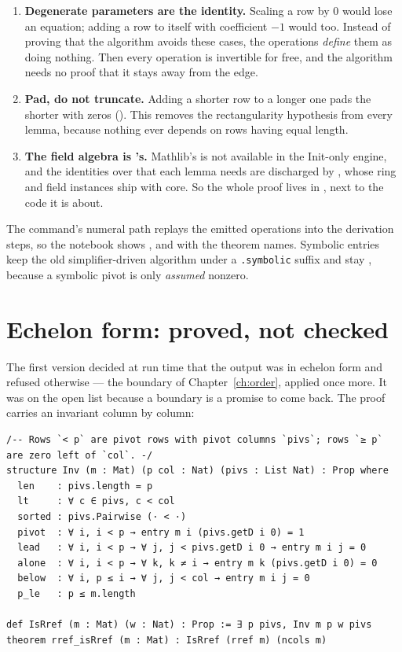 \begin{enumerate}[nosep]
  \item \textbf{Degenerate parameters are the identity.} Scaling a row by $0$ would lose an
    equation; adding a row to itself with coefficient $-1$ would too. Instead of proving that
    the algorithm avoids these cases, the operations \emph{define} them as doing nothing. Then
    every operation is invertible for free, and the algorithm needs no proof that it stays
    away from the edge.
  \item \textbf{Pad, do not truncate.} Adding a shorter row to a longer one pads the shorter with
    zeros (). This removes the rectangularity hypothesis from every lemma, because
    nothing ever depends on rows having equal length.
  \item \textbf{The field algebra is 's.} Mathlib's  is not available in the
    Init-only engine, and the identities over  that each lemma needs are discharged by
    , whose ring and field instances ship with core. So the whole proof lives in
    , next to the code it is about.
\end{enumerate}

The command's numeral path replays the emitted operations into the derivation steps, so the
notebook shows ,  and  with the theorem names.
Symbolic entries keep the old simplifier-driven algorithm under a \texttt{.symbolic} suffix and
stay , because a symbolic pivot is only \emph{assumed} nonzero.

\section{Echelon form: proved, not checked}

The first version decided at run time that the output was in echelon form and refused otherwise
--- the boundary of Chapter~\ref{ch:order}, applied once more. It was on the open list because a
boundary is a promise to come back. The proof carries an invariant column by column:

\begin{verbatim}
/-- Rows `< p` are pivot rows with pivot columns `pivs`; rows `≥ p` are zero left of `col`. -/
structure Inv (m : Mat) (p col : Nat) (pivs : List Nat) : Prop where
  len    : pivs.length = p
  lt     : ∀ c ∈ pivs, c < col
  sorted : pivs.Pairwise (· < ·)
  pivot  : ∀ i, i < p → entry m i (pivs.getD i 0) = 1
  lead   : ∀ i, i < p → ∀ j, j < pivs.getD i 0 → entry m i j = 0
  alone  : ∀ i, i < p → ∀ k, k ≠ i → entry m k (pivs.getD i 0) = 0
  below  : ∀ i, p ≤ i → ∀ j, j < col → entry m i j = 0
  p_le   : p ≤ m.length

def IsRref (m : Mat) (w : Nat) : Prop := ∃ p pivs, Inv m p w pivs
theorem rref_isRref (m : Mat) : IsRref (rref m) (ncols m)
\end{verbatim}

